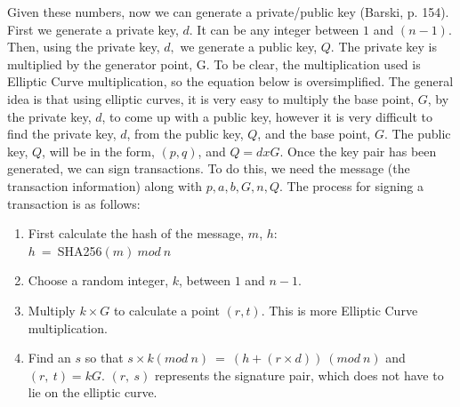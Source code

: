 \documentclass{article}
\begin{document}
	Given these numbers, now we can generate a private/public key (Barski, p. 154). First we generate a private key, \(d\). It can be any integer between \(1\) and \((n-1)\). Then, using the private key, \(d,\) we generate a public key, \(Q\). The private key is multiplied by the generator point, G. To be clear, the multiplication used is Elliptic Curve multiplication, so the equation below is oversimplified. The general idea is that using elliptic curves, it is very easy to multiply the base point, \(G\), by the private key, \(d\), to come up with a public key, however it is very difficult to find the private key, \(d\), from the public key, \(Q\), and the base point, \(G\). The public key, \(Q\), will be in the form, \((p, q)\), and \(Q = d x G\). 
 Once the key pair has been generated, we can sign transactions. To do this, we need the message (the transaction information) along with \(p, a, b, G, n, Q\). The process for signing a transaction is as follows:

\begin{enumerate}
\item First calculate the hash of the message, $m$, \(h\):\\
	\(h\ =\ \)SHA256\((m)\ mod\ n\)
\item Choose a random integer, \(k\), between \(1\) and \(n-1\).
\item Multiply \(k \times G\) to calculate a point \((r, t)\). This is more Elliptic Curve multiplication.
\item Find an \(s\) so that \(s \times k (mod\ n)\ =\ (h+(r \times d))\ (mod\ n)\) and \((r,\ t) = kG\). \((r,\ s)\) represents the signature pair, which does not have to lie on the elliptic curve.
\end{enumerate} 
 
\end{document}
